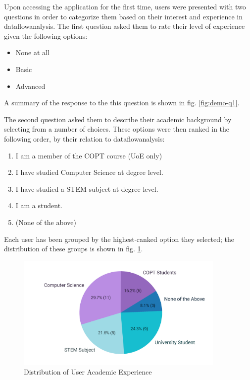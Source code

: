 \documentclass[bsc,twoside,singlespacing,parskip,logo,notimes,normalheadings]{infthesis}
\begin{document}
    Upon accessing the application for the first time, users were
    presented with two questions in order to categorize them based on
    their interest and experience in \gls{dataflowanalysis}. The first
    question asked them to rate their level of experience given the
    following options:

    \begin{itemize}
    \item None at all
    \item Basic
    \item Advanced
    \end{itemize}

    A summary of the response to the this question is shown in
    fig. \ref{fig:demo-q1}.

    The second question asked them to describe their academic
    background by selecting from a number of choices. These options
    were then ranked in the following order, by their relation to
    \gls{dataflowanalysis}:
    
    \begin{enumerate}
      \item I am a member of the COPT course (UoE only)
      \item I have studied Computer Science at degree level.
      \item I have studied a STEM subject at degree level.
      \item I am a student.
      \item (None of the above)
    \end{enumerate}

    Each user has been grouped by the highest-ranked option they
    selected; the distribution of these groups is shown in
    fig. \ref{fig:demo-q2}.

    \begin{figure}[!hb]
      \centering
      \captionsetup{width=\textwidth, justification=centering}
      \caption{Distribution of User Academic Experience}\label{fig:demo-q2}
      \includegraphics[width=0.9\textwidth, trim=40 200 0 0]{img/background_pie.pdf}
    \end{figure}
\end{document}
